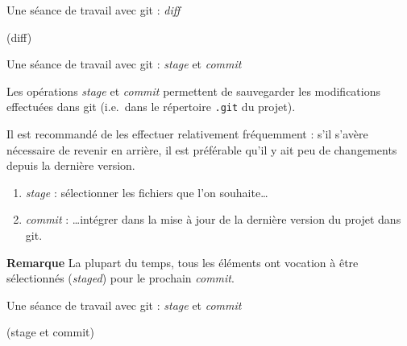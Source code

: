 \documentclass[12pt,handout,ignorenonframetext,]{beamer}
\providecommand{\tightlist}{%
  \setlength{\itemsep}{0pt}\setlength{\parskip}{0pt}}
\newcommand{\intertitre}[1]{\textbf{\textcolor{redInsee}{#1}}}
\begin{document}
\begin{frame}{Une séance de travail avec git : \emph{diff}}

(diff)

\end{frame}

\begin{frame}[fragile]{\large Une séance de travail avec git :
\emph{stage} et \emph{commit}}

Les opérations \emph{stage} et \emph{commit} permettent de sauvegarder
les modifications effectuées dans git (i.e.~dans le répertoire
\texttt{.git} du projet).

\bigskip \pause Il est recommandé de les effectuer relativement
fréquemment : s'il s'avère nécessaire de revenir en arrière, il est
préférable qu'il y ait peu de changements depuis la dernière version.

\begin{enumerate}
\def\labelenumi{\arabic{enumi}.}
\tightlist
\item
  \bigskip \pause \textit{stage} : sélectionner les fichiers que l'on
  souhaite\ldots{}
\item
  \pause \textit{commit} : \ldots{}intégrer dans la mise à jour de la
  dernière version du projet dans git.
\end{enumerate}

\bigskip \pause \intertitre{Remarque} La plupart du temps, tous les
éléments ont vocation à être sélectionnés (\emph{staged}) pour le
prochain \emph{commit}.

\end{frame}

\begin{frame}{\large Une séance de travail avec git : \emph{stage} et
\emph{commit}}

(stage et commit)

\end{frame}
\end{document}
